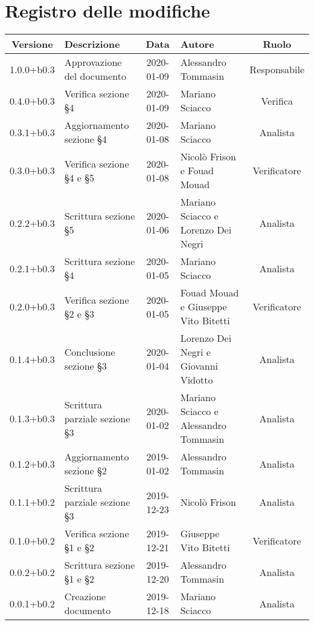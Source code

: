 \section*{Registro delle modifiche}

\begin{center}
	\begin{longtable}{|c|p{3cm}|c|p{4cm}|c|}
	\hline
	\rowcolor{lighter-grayer}
	\textbf{Versione} & \textbf{Descrizione} & \textbf{Data} & \textbf{Autore} & \textbf{Ruolo} \\
	\hline
	\endfirsthead

	1.0.0+b0.3 & Approvazione del documento & 2020-01-09 & Alessandro Tommasin & Responsabile \\
	\hline
	0.4.0+b0.3 & Verifica sezione \S4 & 2020-01-09 & Mariano Sciacco & Verifica \\
	\hline
	0.3.1+b0.3 & Aggiornamento sezione \S4 & 2020-01-08 & Mariano Sciacco & Analista \\
	\hline
	0.3.0+b0.3 & Verifica sezione \S4 e \S5 & 2020-01-08 & Nicolò Frison e Fouad Mouad & Verificatore \\
	\hline
	0.2.2+b0.3 & Scrittura sezione \S5 & 2020-01-06 & Mariano Sciacco e Lorenzo Dei Negri & Analista \\
	\hline
	0.2.1+b0.3 & Scrittura sezione \S4 & 2020-01-05 & Mariano Sciacco & Analista \\
	\hline
	0.2.0+b0.3 & Verifica sezione \S2 e \S3 & 2020-01-05 & Fouad Mouad e Giuseppe Vito Bitetti & Verificatore \\
	\hline
	0.1.4+b0.3 & Conclusione sezione \S3 & 2020-01-04 & Lorenzo Dei Negri e Giovanni Vidotto & Analista \\
	\hline
	0.1.3+b0.3 & Scrittura parziale sezione \S3 & 2020-01-02 & Mariano Sciacco e Alessandro Tommasin & Analista \\
	\hline
	0.1.2+b0.3 & Aggiornamento sezione \S2 & 2019-01-02 & Alessandro Tommasin & Analista \\
	\hline
	0.1.1+b0.2 & Scrittura parziale sezione \S3 & 2019-12-23 & Nicolò Frison & Analista \\
	\hline
	0.1.0+b0.2 & Verifica sezione \S1 e \S2 & 2019-12-21 & Giuseppe Vito Bitetti & Verificatore \\
	\hline
	0.0.2+b0.2 & Scrittura sezione \S1 e \S2 & 2019-12-20 & Alessandro Tommasin & Analista \\
	\hline
	0.0.1+b0.2 & Creazione documento & 2019-12-18 & Mariano Sciacco & Analista \\
	\hline

	\end{longtable}
\end{center}